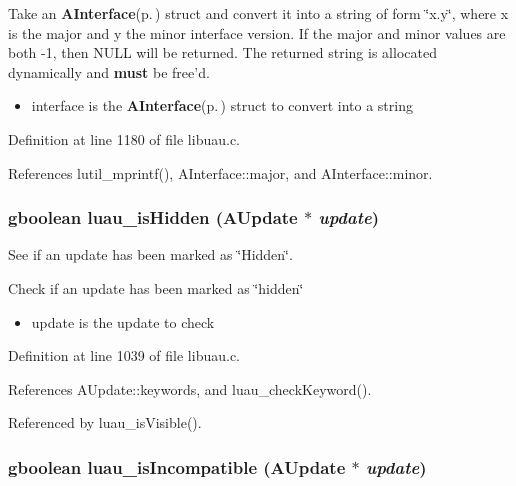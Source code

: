 Take an {\bf AInterface}{\rm (p.\,\pageref{structAInterface})} struct and convert it into a string of form \char`\"{}x.y\char`\"{}, where x is the major and y the minor interface version. If the major and minor values are both -1, then NULL will be returned. The returned string is allocated dynamically and {\bf must} be free'd.

\begin{itemize}
\item interface is the {\bf AInterface}{\rm (p.\,\pageref{structAInterface})} struct to convert into a string 
\end{itemize}


Definition at line 1180 of file libuau.c.

References lutil\_\-mprintf(), AInterface::major, and AInterface::minor.
\subsubsection{\setlength{\rightskip}{0pt plus 5cm}gboolean luau\_\-is\-Hidden ({\bf AUpdate} $\ast$ {\em update})}\label{libuau_8h_a82}


See if an update has been marked as \char`\"{}Hidden\char`\"{}. 

Check if an update has been marked as \char`\"{}hidden\char`\"{}

\begin{itemize}
\item update is the update to check 
\end{itemize}


Definition at line 1039 of file libuau.c.

References AUpdate::keywords, and luau\_\-check\-Keyword().

Referenced by luau\_\-is\-Visible().
\subsubsection{\setlength{\rightskip}{0pt plus 5cm}gboolean luau\_\-is\-Incompatible ({\bf AUpdate} $\ast$ {\em update})}\label{libuau_8h_a81}


